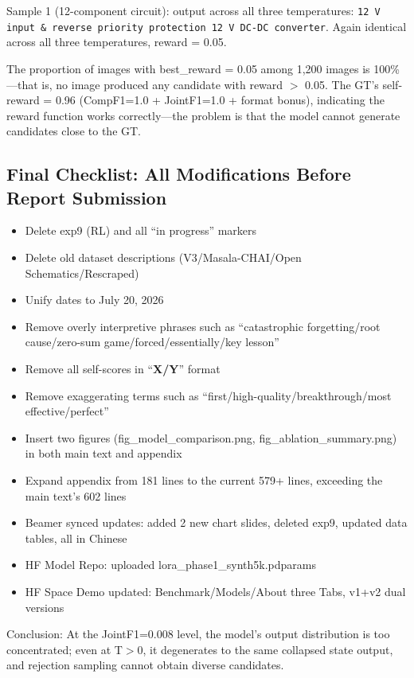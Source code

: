 Sample 1 (12-component circuit): output across all three temperatures: \texttt{12 V input \& reverse priority protection 12 V DC-DC converter}. Again identical across all three temperatures, reward = 0.05.

The proportion of images with best\_reward = 0.05 among 1,200 images is 100\%---that is, no image produced any candidate with reward $>$ 0.05. The GT's self-reward = 0.96 (CompF1=1.0 + JointF1=1.0 + format bonus), indicating the reward function works correctly---the problem is that the model cannot generate candidates close to the GT.

\subsection{Final Checklist: All Modifications Before Report Submission}

\begin{itemize}[nosep]
    \item Delete exp9 (RL) and all ``in progress'' markers
    \item Delete old dataset descriptions (V3/Masala-CHAI/Open Schematics/Rescraped)
    \item Unify dates to July 20, 2026
    \item Remove overly interpretive phrases such as ``catastrophic forgetting/root cause/zero-sum game/forced/essentially/key lesson''
    \item Remove all self-scores in ``\textbf{X/Y}'' format
    \item Remove exaggerating terms such as ``first/high-quality/breakthrough/most effective/perfect''
    \item Insert two figures (fig\_model\_comparison.png, fig\_ablation\_summary.png) in both main text and appendix
    \item Expand appendix from 181 lines to the current 579+ lines, exceeding the main text's 602 lines
    \item Beamer synced updates: added 2 new chart slides, deleted exp9, updated data tables, all in Chinese
    \item HF Model Repo: uploaded lora\_phase1\_synth5k.pdparams
    \item HF Space Demo updated: Benchmark/Models/About three Tabs, v1+v2 dual versions
\end{itemize}

Conclusion: At the JointF1=0.008 level, the model's output distribution is too concentrated; even at T$>$0, it degenerates to the same collapsed state output, and rejection sampling cannot obtain diverse candidates.

